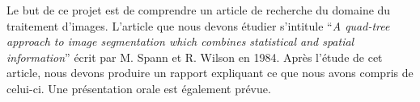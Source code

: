 Le but de ce projet est de comprendre un article de recherche du domaine du traitement d'images. L'article que nous devons étudier s'intitule \enquote{\textit{A quad-tree approach to image segmentation which combines statistical and spatial information}} écrit par M. Spann et R. Wilson en 1984. Après l'étude de cet article, nous devons produire un rapport expliquant ce que nous avons compris de celui-ci. Une présentation orale est également prévue.